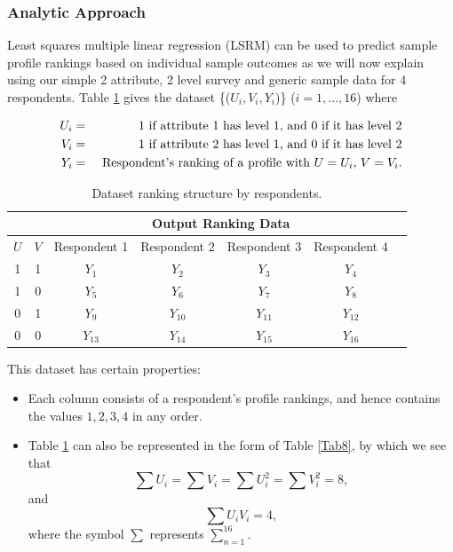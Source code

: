 \documentclass[a4paper, 12pt]{article}
\begin{document}
\subsubsection{Analytic Approach}

Least squares multiple linear regression (LSRM) can be used to predict sample profile rankings based on individual sample outcomes as we will now explain using our simple 2 attribute, 2 level survey and generic sample data for 4 respondents. Table \ref{Tab7} gives the dataset \{($U_i,V_i,Y_i$)\} ($i = 1,...,16$) where

\begin{eqnarray*}
	U_i&=& 1 \textup{ if attribute 1 has level 1, and 0 if it has level 2}\\
	V_i&=& 1 \textup{ if attribute 2 has level 1, and 0 if it has level 2}\\
	Y_i&=& \textup{ Respondent's ranking of a profile with $U=U_i$, $V=V_i$.}
\end{eqnarray*}

\begin{table}[!htpb]
	\centering
	\small
	\begin{tabular}{cc|ccccc}
		\multicolumn{2}{c}{} &\multicolumn{4}{c}{Output Ranking Data}\\\hline
		$U$ & $V$ & Respondent 1&  Respondent 2& Respondent 3& Respondent 4\\  \hline
		1 &1&$Y_1$&$Y_2$&$Y_3$&$Y_4$\\
		1 &0&$Y_5$&$Y_6$&$Y_7$&$Y_8$ \\
		0 &1&$Y_9$&$Y_{10}$&$Y_{11}$&$Y_{12}$ \\
		0 &0&$Y_{13}$&$Y_{14}$&$Y_{15}$&$Y_{16}$ \\\hline
	\end{tabular}
	\caption{{\small Dataset ranking structure by respondents.}}
	\label{Tab7}
\end{table}


This dataset has certain properties:
\begin{itemize}
	\item
	Each column consists of a respondent's profile rankings, and hence contains the values $1, 2, 3, 4$ in any order.
	
	\item
	Table \ref{Tab7} can also be represented in the form of Table \ref{Tab8}, by which we see that $$\sum U_i = \sum V_i = \sum U_i^2 = \sum V_i^2= 8, $$ and $$ \sum U_iV_i = 4,$$ where the symbol $\sum $ represents $\displaystyle \sum_{n=1}^{16}$.
\end{itemize}
\end{document}
